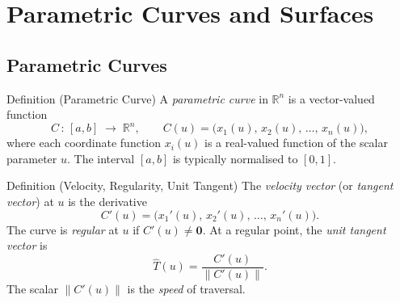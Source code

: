 
\section{Parametric Curves and Surfaces}


\subsection*{Parametric Curves}

\begin{propositionbox}{Definition (Parametric Curve)}
A \emph{parametric curve} in $\mathbb{R}^n$ is a vector-valued function
\[
  C\,:\,[a,b]\;\to\;\mathbb{R}^n, \qquad
  C(u) = \bigl(x_1(u),\,x_2(u),\,\ldots,\,x_n(u)\bigr),
\]
where each coordinate function $x_i(u)$ is a real-valued function
of the scalar parameter $u$.
The interval $[a,b]$ is typically normalised to $[0,1]$.
\end{propositionbox}

\begin{propositionbox}{Definition (Velocity, Regularity, Unit Tangent)}
The \emph{velocity vector} (or \emph{tangent vector}) at $u$ is the derivative
\[
  C'(u) = \bigl(x_1'(u),\,x_2'(u),\,\ldots,\,x_n'(u)\bigr).
\]
The curve is \emph{regular} at $u$ if $C'(u) \neq \mathbf{0}$.
At a regular point, the \emph{unit tangent vector} is
\[
  \hat{T}(u) = \frac{C'(u)}{\|C'(u)\|}.
\]
The scalar $\|C'(u)\|$ is the \emph{speed} of traversal.
\end{propositionbox}

